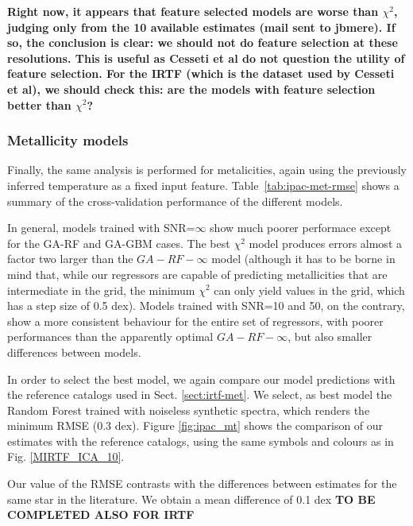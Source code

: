 {\bf Right now, it appears that feature selected models are worse than
$\chi^2$, judging only from the 10 available estimates (mail sent to
jbmere). If so, the conclusion is clear: we should not do feature
selection at these resolutions. This is useful as Cesseti et al do not
question the utility of feature selection. For the IRTF (which is the
dataset used by Cesseti et al), we should check this: are the models
with feature selection better than $\chi^2$?}

\subsubsection{Metallicity models} 

Finally, the same analysis is performed for metalicities, again using
the previously inferred temperature as a fixed input feature.
Table~\ref{tab:ipac-met-rmse} shows a summary of the cross-validation
performance of the different models.

In general, models trained with SNR=$\infty$ show much poorer 
performace except for the GA-RF and GA-GBM cases. The best $\chi^2$ 
model produces errors almost a factor two larger than the 
$GA-RF-\infty$ model (although it has to be borne in mind that, while 
our regressors are capable of predicting metallicities that are 
intermediate in the grid, the minimum $\chi^2$ can only yield values 
in the grid, which has a step size of 0.5 dex). Models trained with 
SNR=10 and 50, on the contrary,  show a more consistent behaviour for 
the entire set of regressors, with poorer performances than the 
apparently optimal $GA-RF-\infty$, but also smaller differences between models. 

%
%

In order to select the best model, we again compare our model
predictions with the reference catalogs used in
Sect. \ref{sect:irtf-met}. We select, as best model the Random Forest
trained with noiseless synthetic spectra, which renders the minimum
RMSE (0.3 dex). Figure \ref{fig:ipac_mt} shows the comparison of our
estimates with the reference catalogs, using the same symbols and
colours as in Fig. \ref{MIRTF_ICA_10}.

Our value of the RMSE contrasts with the differences between estimates
for the same star in the literature. We obtain a mean difference of
0.1 dex {\bf TO BE COMPLETED ALSO FOR IRTF}




